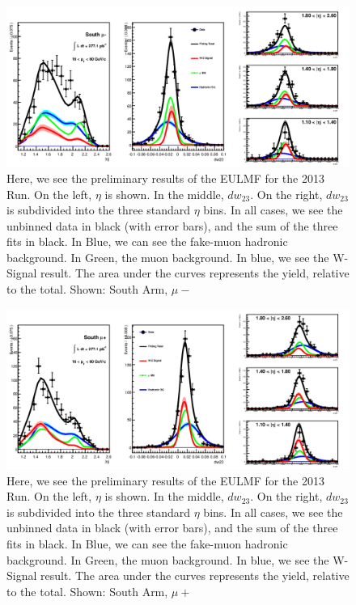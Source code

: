 \begin{figure}
  \centering
  \includegraphics[width=\linewidth]{./figures/prelim_full_maxlikefit_a0q0.jpg}
  \caption{
    Here, we see the preliminary results of the EULMF for the 2013 Run. On the
    left, $\eta$ is shown. In the middle, $dw_{23}$. On the right, $dw_{23}$ is
    subdivided into the three standard $\eta$ bins. In all cases, we see the
    unbinned data in black (with error bars), and the sum of the three fits in
    black. In Blue, we can see the fake-muon hadronic background. In Green, the
    muon background. In blue, we see the W-Signal result. The area under the
    curves represents the yield, relative to the total. Shown: South Arm,
    $\mu-$~\cite{Seidl2014a}
  }
  \label{fig:maxlikefit_a0q0}
\end{figure}

\begin{figure}
  \centering
  \includegraphics[width=\linewidth]{./figures/prelim_full_maxlikefit_a0q1.jpg}
  \caption{
    Here, we see the preliminary results of the EULMF for the 2013 Run. On the
    left, $\eta$ is shown. In the middle, $dw_{23}$. On the right, $dw_{23}$ is
    subdivided into the three standard $\eta$ bins. In all cases, we see the
    unbinned data in black (with error bars), and the sum of the three fits in
    black. In Blue, we can see the fake-muon hadronic background. In Green, the
    muon background. In blue, we see the W-Signal result. The area under the
    curves represents the yield, relative to the total.  Shown: South Arm,
    $\mu+$~\cite{Seidl2014a}
  }
  \label{fig:maxlikefit_a0q1}
\end{figure}

